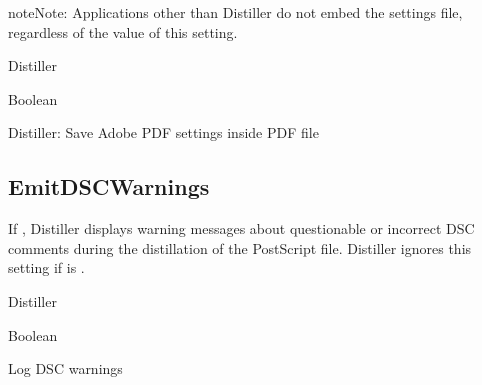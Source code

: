 \documentclass[letterpaper,12pt,english,openany,oneside]{sphinxmanual}
\begin{document}
\begin{sphinxadmonition}{note}{Note:}
Applications other than Distiller do not embed the settings file, regardless of the value of this setting.
\end{sphinxadmonition}
\label{\detokenize{PDF_Create_CommonSettings:supported-by-95}}

Distiller

\label{\detokenize{PDF_Create_CommonSettings:type-94}}

Boolean

\label{\detokenize{PDF_Create_CommonSettings:ui-name-77}}

Distiller: Save Adobe PDF settings inside PDF file

\label{\detokenize{PDF_Create_CommonSettings:default-value-89}}

\begin{sphinxVerbatim}[commandchars=\\\{\}]
\end{sphinxVerbatim}


\subsection{EmitDSCWarnings}
\label{\detokenize{PDF_Create_CommonSettings:emitdscwarnings}}
If  , Distiller displays warning messages about questionable or incorrect DSC comments during the distillation of the PostScript file. Distiller ignores this setting if  is  .

\label{\detokenize{PDF_Create_CommonSettings:supported-by-96}}

Distiller

\label{\detokenize{PDF_Create_CommonSettings:type-95}}

Boolean

\label{\detokenize{PDF_Create_CommonSettings:ui-name-78}}

Log DSC warnings

\label{\detokenize{PDF_Create_CommonSettings:default-value-90}}

\begin{sphinxVerbatim}[commandchars=\\\{\}]
\end{sphinxVerbatim}
\end{document}
